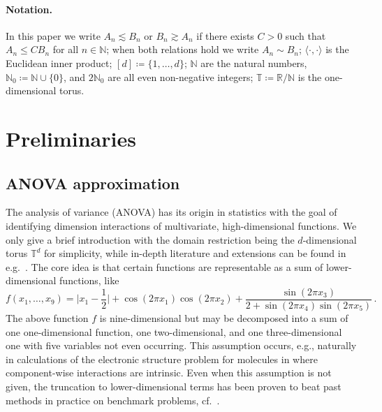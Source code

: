 \documentclass[a4paper]{scrartcl}
\numberwithin{equation}{section}
\begin{document}
\paragraph{Notation.}
In this paper  we write $A_n\lesssim B_n$ or $B_n\gtrsim A_n$ if there exists $C>0$ such that $A_n \le C B_n$ for all $n\in\mathds N$;
when both relations hold we write $A_n\sim B_n$;
$\langle\cdot,\cdot\rangle$ is the Euclidean inner product;
$[d] \coloneqq \{1,\dots,d\}$;
$\mathds N$ are the natural numbers, $\mathds N_0 \coloneqq \mathds N\cup\{0\}$, and $2\mathds N_0$ are all even non-negative integers;
$\mathds T \coloneqq\mathds R/\mathds N$ is the one-dimensional torus.


 \section{Preliminaries}\label{sec:pre} 

\subsection{ANOVA approximation}\label{sec:anova} 

The analysis of variance (ANOVA) has its origin in statistics with the goal of identifying dimension interactions of multivariate, high-dimensional functions.
We only give a brief introduction with the domain restriction being the $d$-dimensional torus $\mathds T^d$ for simplicity, while in-depth literature and extensions can be found in e.g.~\cite{CMO97, RA99, LO06, NW08, KSWW09, Gu13, Schmischke22}.
The core idea is that certain functions are representable as a sum of lower-dimensional functions, like
\begin{equation*}
    f(x_1,\dots,x_9)
    =
    \Big|x_1-\frac 12\Big|
    +\cos(2\pi x_1)\cos(2\pi x_2) +\frac{\sin(2\pi x_3)}{2 + \sin(2\pi x_4)\sin(2\pi x_5)} \,.
\end{equation*}
The above function $f$ is nine-dimensional but may be decomposed into a sum of one one-dimensional function, one two-dimensional, and one three-dimensional one with five variables not even occurring.
This assumption occurs, e.g., naturally in calculations of the electronic structure problem for molecules in \cite{GHH11} where component-wise interactions are intrinsic.
Even when this assumption is not given, the truncation to lower-dimensional terms has been proven to beat past methods in practice on benchmark problems, cf.~\cite[Chapter~6]{Schmischke22}.
\end{document}

